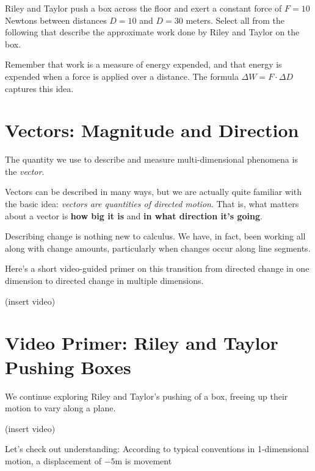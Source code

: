\documentclass{ximera}
\begin{document}
\begin{problem}
Riley and Taylor push a box across the floor and exert a constant force of $F=10$ Newtons between distances $D=10$ and $D=30$ meters. Select all from the following that describe the approximate work done by Riley and Taylor on the box.

\begin{selectAll}
\end{selectAll}
\begin{feedback}
Remember that work is a measure of energy expended, and that energy is expended when a force is applied over a distance. The formula $\Delta W=F\cdot \Delta D$ captures this idea.
\end{feedback}
\end{problem}


\section*{Vectors: Magnitude and Direction}

The quantity we use to describe and measure multi-dimensional phenomena is the \emph{vector}. 

Vectors can be described in many ways, but we are actually quite familiar with the basic idea: \emph{vectors are quantities of directed motion}. That is, what matters about a vector is {\bf how big it is} and {\bf in what direction it's going}.

Describing change is nothing new to calculus. We have, in fact, been working all along with change amounts, particularly when changes occur along line segments. 

Here's a short video-guided primer on this transition from directed change in one dimension to directed change in multiple dimensions.

(insert video)

\section*{Video Primer: Riley and Taylor Pushing Boxes}

    We continue exploring Riley and Taylor's pushing of a box, freeing up their motion to vary along a plane.

    (insert video)

\begin{problem}
    Let's check out understanding: According to typical conventions in 1-dimensional motion, a displacement of $-5$m is movement 
\end{problem}
    
\end{document}
